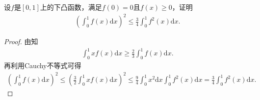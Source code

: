 \documentclass[../../main.tex]{subfiles}%
\begin{document}
\begin{example}
设$f$是$[0,1]$上的下凸函数，满足$f(0)=0$且$f(x)\geqslant 0$，证明
\begin{align*}
\left( \int_0^1{f\left( x \right) \mathrm{d}x} \right) ^2\leqslant \frac{3}{4}\int_0^1{f^2\left( x \right) \mathrm{d}x}.
\end{align*}
\end{example}
\begin{proof}

由知
\begin{align*}
\int_0^1{xf\left( x \right) \mathrm{d}x}\geqslant \frac{2}{3}\int_0^1{f\left( x \right) \mathrm{d}x}.
\end{align*}
再利用Cauchy不等式可得
\begin{align*}
\left( \int_0^1{f\left( x \right) \mathrm{d}x} \right) ^2\leqslant \left( \frac{3}{2}\int_0^1{xf\left( x \right) \mathrm{d}x} \right) ^2\leqslant \frac{9}{4}\int_0^1{x^2\mathrm{d}x}\int_0^1{f^2\left( x \right) \mathrm{d}x}=\frac{3}{4}\int_0^1{f^2\left( x \right) \mathrm{d}x}.
\end{align*}

\end{proof}
\end{document}
